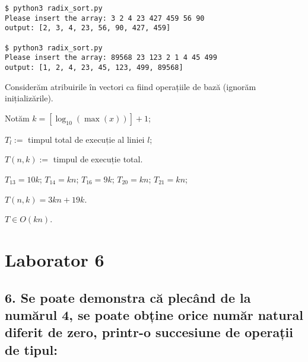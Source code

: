 \documentclass[11pt]{article}
\begin{document}
\begin{verbatim}
$ python3 radix_sort.py
Please insert the array: 3 2 4 23 427 459 56 90
output: [2, 3, 4, 23, 56, 90, 427, 459]

$ python3 radix_sort.py
Please insert the array: 89568 23 123 2 1 4 45 499
output: [1, 2, 4, 23, 45, 123, 499, 89568]
\end{verbatim}

Considerăm atribuirile în vectori ca fiind operațiile de bază (ignorăm inițializările).

Notăm $k = [\log_{10}(\max(x))] + 1$;

$T_l := $ timpul total de execuție al liniei $l$;

$T(n, k) :=$ timpul de execuție total.

\vspace{7pt}
$T_{13} = 10 k$;
$T_{14} = k n$;
$T_{16} = 9 k$;
$T_{20} = k n$;
$T_{21} = k n$;

$T(n, k) = 3kn + 19k$.

\vspace{7pt}
$T \in O(kn)$.

\section*{Laborator 6}
\label{sec:orga7b8922}
\subsection*{6. Se poate demonstra că plecând de la numărul 4, se poate obține orice număr natural diferit de zero, printr-o succesiune de operații de tipul:}
\label{sec:org1b7aab3}
\end{document}
